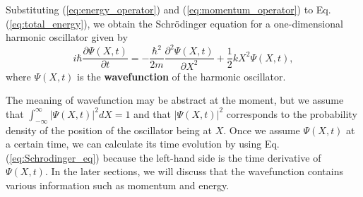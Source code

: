 \documentclass{book}
\begin{document}
Substituting (\ref{eq:energy_operator}) and (\ref{eq:momentum_operator}) to Eq. (\ref{eq:total_energy}), we obtain the Schr\"odinger equation for a one-dimensional harmonic oscillator given by
\begin{equation}
  i\hbar\frac{\partial \Psi(X,t)}{\partial t} = -\frac{\hbar^2}{2m}\frac{\partial^2 \Psi(X,t)}{\partial X^2} + \frac 1 2 kX^2\Psi(X,t),
  \label{eq:Schrodinger_eq}
\end{equation}
where $\Psi(X, t)$ is the \textbf{wavefunction} of the harmonic oscillator. 

The meaning of wavefunction may be abstract at the moment, but we assume that $\int_{-\infty}^{\infty}|\Psi(X,t)|^2 dX = 1$ and that $|\Psi(X,t)|^2$ corresponds to the probability density of the position of the oscillator being at $X$. Once we assume $\Psi(X,t)$ at a certain time, we can calculate its time evolution by using Eq. (\ref{eq:Schrodinger_eq}) because the left-hand side is the time derivative of $\Psi(X,t)$. In the later sections, we will discuss that the wavefunction contains various information such as momentum and energy. 
\end{document}

